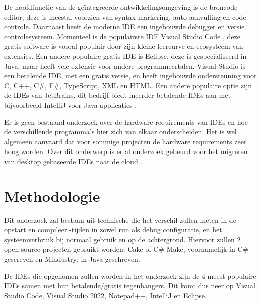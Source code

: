 De hoofdfunctie van de geïntegreerde ontwikkelingsomgeving is de broncode-editor, deze is meestal voorzien van syntax markering, auto aanvulling en code controle. Daarnaast heeft de moderne IDE een ingebouwde debugger en versie controlesysteem. Momenteel is de populairste IDE Visual Studio Code \autocite{StackOverflow2021}, deze gratis software is vooral populair door zijn kleine leercurve en ecosysteem van extensies. Een andere populaire gratis IDE is Eclipse, deze is gespecialiseerd in Java, maar heeft vele extensie voor andere programmeertalen. Visual Studio is een betalende IDE, met een gratis versie, en heeft ingebouwde ondersteuning voor C, C++, C\#, F\#, TypeScript, XML en HTML. Een andere populaire optie zijn de IDEs van JetBrains, dit bedrijf biedt meerder betalende IDEs aan met bijvoorbeeld IntelliJ voor Java-applicaties .

Er is geen bestaand onderzoek over de hardware requirements van IDEs en hoe de verschillende programma’s hier zich van elkaar onderscheiden. Het is wel algemeen aanvaard dat voor sommige projecten de hardware requirements zeer hoog worden. Over dit onderwerp is er al onderzoek gebeurd voor het migreren van desktop gebaseerde IDEs naar de cloud \autocite{Devadiga2021}.


\section{Methodologie}
\label{sec:methodologie}

Dit onderzoek zal bestaan uit technische die het verschil zullen  meten in de opstart en compileer -tijden in zowel run als debug configuratie, en het systeemverbruik bij normaal gebruik en op de achtergrond. Hiervoor zullen 2 open source projecten gebruikt worden: Cake of C\# Make, voornamelijk in C\# gescreven en Mindustry; in Java geschreven.

De IDEs die opgenomen zullen worden in het onderzoek zijn de 4 meest populaire IDEs \autocite{StackOverflow2021} samen met hun betalende/gratis tegenhangers. Dit komt dus neer op Visual Studio Code, Visual Studio 2022, Notepad++, IntelliJ en Eclipse. 

